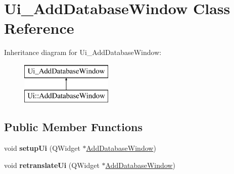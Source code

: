 \hypertarget{class_ui___add_database_window}{}\section{Ui\+\_\+\+Add\+Database\+Window Class Reference}
\label{class_ui___add_database_window}
Inheritance diagram for Ui\+\_\+\+Add\+Database\+Window\+:\begin{figure}[H]
\begin{center}
\leavevmode
\includegraphics[height=2.000000cm]{class_ui___add_database_window}
\end{center}
\end{figure}
\subsection*{Public Member Functions}
\begin{DoxyCompactItemize}
\item 
\mbox{\label{class_ui___add_database_window_a7907700637591b9da392ef46548df7d7}} 
void {\bfseries setup\+Ui} (Q\+Widget $\ast$\mbox{\hyperlink{class_add_database_window}{Add\+Database\+Window}})
\item 
\mbox{\label{class_ui___add_database_window_a905d92efe4020e6450f67a8db8ea8a96}} 
void {\bfseries retranslate\+Ui} (Q\+Widget $\ast$\mbox{\hyperlink{class_add_database_window}{Add\+Database\+Window}})
\end{DoxyCompactItemize}

